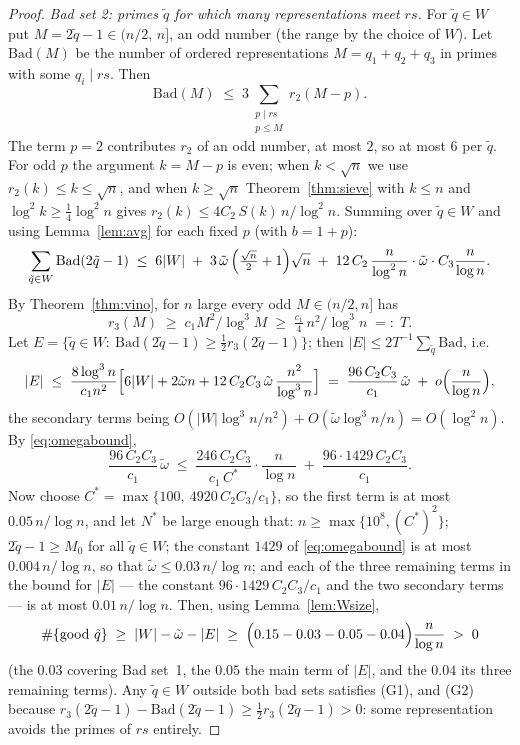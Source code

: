 \documentclass[11pt]{amsart}
\numberwithin{equation}{section}
\theoremstyle{remark}
\begin{document}
\begin{proof}
\emph{Bad set 2: primes $\tilde q$ for which many representations meet $rs$.}
For $\tilde q\in W$ put $M=2\tilde q-1\in(n/2,\,n]$, an odd number (the range by
the choice of $W$). Let $\mathrm{Bad}(M)$ be the number of
ordered representations $M=q_1+q_2+q_3$ in primes with some $q_i\mid rs$. Then
\[
\mathrm{Bad}(M)\;\le\;3\sum_{\substack{p\mid rs\\ p\le M}} r_2(M-p).
\]
The term $p=2$ contributes $r_2$ of an odd number, at most $2$, so at most $6$ per
$\tilde q$. For odd $p$ the argument $k=M-p$ is even; when $k<\sqrt n$ we use
$r_2(k)\le k\le\sqrt n$, and when $k\ge\sqrt n$ Theorem~\ref{thm:sieve} with
$k\le n$ and $\log^2k\ge\tfrac14\log^2n$ gives $r_2(k)\le 4C_2\,S(k)\,n/\log^2n$.
Summing over $\tilde q\in W$ and using Lemma~\ref{lem:avg} for each fixed $p$
(with $b=1+p$):
\[
\sum_{\tilde q\in W}\mathrm{Bad}(2\tilde q-1)
\;\le\;6|W|\;+\;3\,\tilde\omega\,\Bigl(\tfrac{\sqrt n}2+1\Bigr)\sqrt n
\;+\;12\,C_2\,\frac{n}{\log^2 n}\cdot \tilde\omega\cdot C_3\frac{n}{\log n} .
\]
By Theorem~\ref{thm:vino}, for $n$ large every odd $M\in(n/2,n]$ has
\[
r_3(M)\;\ge\;c_1M^2/\log^3M\;\ge\;\tfrac{c_1}4\,n^2/\log^3 n\;=:\;T .
\]
Let
$E=\{\tilde q\in W:\ \mathrm{Bad}(2\tilde q-1)\ge\tfrac12 r_3(2\tilde q-1)\}$;
then $|E|\le 2T^{-1}\sum_{\tilde q}\mathrm{Bad}$, i.e.
\[
|E|\;\le\;\frac{8\log^3n}{c_1n^2}\Bigl[6|W|+2\tilde\omega n
+12\,C_2C_3\,\tilde\omega\,\frac{n^2}{\log^3 n}\Bigr]
\;=\;\frac{96\,C_2C_3}{c_1}\,\tilde\omega\;+\;o\Bigl(\frac n{\log n}\Bigr),
\]
the secondary terms being $O(|W|\log^3 n/n^2)+O(\tilde\omega\log^3n/n)
=O(\log^2 n)$. By \eqref{eq:omegabound},
\[
\frac{96\,C_2C_3}{c_1}\,\tilde\omega
\;\le\;\frac{246\,C_2C_3}{c_1\,C^*}\cdot\frac n{\log n}
\;+\;\frac{96\cdot 1429\,C_2C_3}{c_1}.
\]
Now choose $C^*=\max\{100,\ 4920\,C_2C_3/c_1\}$, so the first term is at most
$0.05\,n/\log n$, and let $N^*$ be large enough that: $n\ge\max\{10^8,(C^*)^2\}$;
$2\tilde q-1\ge M_0$ for all $\tilde q\in W$; the constant $1429$ of
\eqref{eq:omegabound} is at most $0.004\,n/\log n$, so that
$\tilde\omega\le0.03\,n/\log n$; and each of the three remaining terms in the
bound for $|E|$ --- the constant $96\cdot1429\,C_2C_3/c_1$ and the two secondary
terms --- is at most $0.01\,n/\log n$. Then, using Lemma~\ref{lem:Wsize},
\[
\#\{\text{good }\tilde q\}\;\ge\;|W|-\tilde\omega-|E|
\;\ge\;\Bigl(0.15-0.03-0.05-0.04\Bigr)\frac n{\log n}\;>\;0
\]
(the $0.03$ covering Bad set~1, the $0.05$ the main term of $|E|$, and the
$0.04$ its three remaining terms).
Any $\tilde q\in W$ outside both bad sets satisfies (G1), and (G2) because
$r_3(2\tilde q-1)-\mathrm{Bad}(2\tilde q-1)\ge\tfrac12r_3(2\tilde q-1)>0$: some
representation avoids the primes of $rs$ entirely.
\end{proof}
\end{document}
